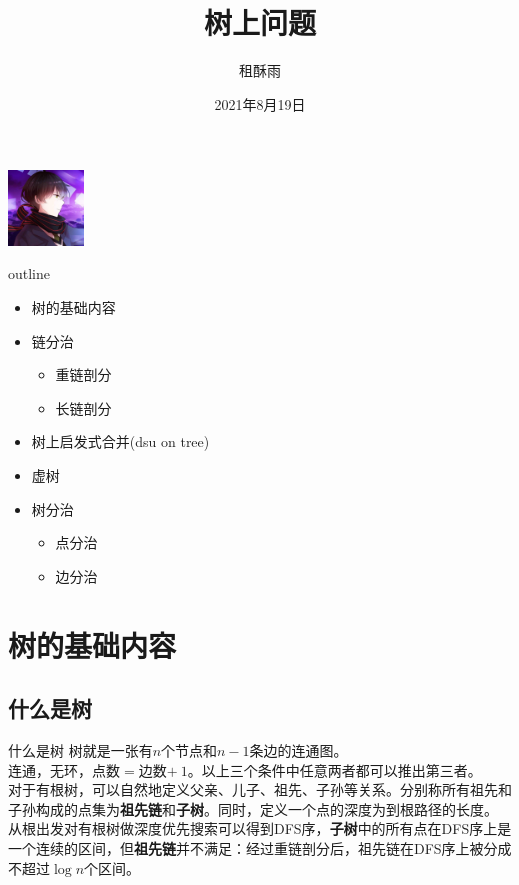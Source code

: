 \documentclass{beamer}
\title{树上问题}
\date{2021年8月19日}
\author{租酥雨}
\begin{document}
\small
	
\begin{frame}
	\titlepage
	\begin{center}
		\includegraphics[width=2.0cm]{zsy.jpg}
	\end{center}
\end{frame}

\begin{frame}{outline}
	\begin{itemize}
		\item 树的基础内容
		\item 链分治
		\begin{itemize}
			\item 重链剖分
			\item 长链剖分
		\end{itemize}
		\item 树上启发式合并(dsu on tree)
		\item 虚树
		\item 树分治
		\begin{itemize}
			\item 点分治
			\item 边分治
		\end{itemize}
	\end{itemize}
\end{frame}

\section{树的基础内容}
\subsection{什么是树}
\begin{frame}{什么是树}
	树就是一张有$n$个节点和$n-1$条边的连通图。\\
	
	连通，无环，点数$=$边数$+\ 1$。以上三个条件中任意两者都可以推出第三者。\\
	
	对于有根树，可以自然地定义父亲、儿子、祖先、子孙等关系。分别称所有祖先和子孙构成的点集为\textbf{祖先链}和\textbf{子树}。同时，定义一个点的深度为到根路径的长度。\\
	
	从根出发对有根树做深度优先搜索可以得到DFS序，\textbf{子树}中的所有点在DFS序上是一个连续的区间，但\textbf{祖先链}并不满足：经过重链剖分后，祖先链在DFS序上被分成不超过$\log n$个区间。
\end{frame}
\end{document}
